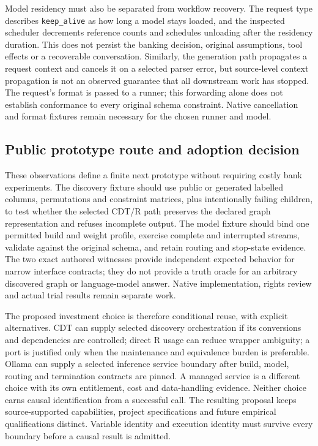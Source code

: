 Model residency must also be separated from workflow recovery. The request type describes
\texttt{keep\_alive} as how long a model stays loaded, and the inspected scheduler decrements
reference counts and schedules unloading after the residency duration. This does not persist
the banking decision, original assumptions, tool effects or a recoverable conversation.
Similarly, the generation path propagates a request context and cancels it on a selected parser
error, but source-level context propagation is not an observed guarantee that all downstream
work has stopped. The request's format is passed to a runner; this forwarding alone does not
establish conformance to every original schema constraint. Native cancellation and format
fixtures remain necessary for the chosen runner and model.~\citep{exec28_bp_ollama}

\subsection{Public prototype route and adoption decision}
These observations define a finite next prototype without requiring costly bank experiments.
The discovery fixture should use public or generated labelled columns, permutations and
constraint matrices, plus intentionally failing children, to test whether the selected CDT/R
path preserves the declared graph representation and refuses incomplete output. The model
fixture should bind one permitted build and weight profile, exercise complete and interrupted
streams, validate against the original schema, and retain routing and stop-state evidence.
The two exact authored witnesses provide independent expected behavior for narrow interface
contracts; they do not provide a truth oracle for an arbitrary discovered graph or language-model
answer. Native implementation, rights review and actual trial results remain separate work.

The proposed investment choice is therefore conditional reuse, with explicit alternatives.
CDT can supply selected discovery orchestration if its conversions and dependencies are controlled;
direct R usage can reduce wrapper ambiguity; a port is justified only when the maintenance and
equivalence burden is preferable. Ollama can supply a selected inference service boundary after
build, model, routing and termination contracts are pinned. A managed service is a different
choice with its own entitlement, cost and data-handling evidence. Neither choice earns causal
identification from a successful call. The resulting proposal keeps source-supported capabilities,
project specifications and future empirical qualifications distinct.
Variable identity and execution identity must survive every boundary before a causal result is admitted.
